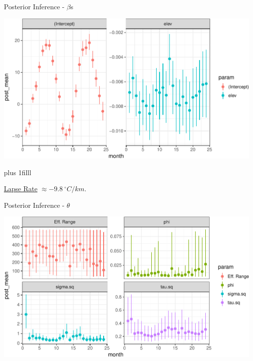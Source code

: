 \documentclass[11pt,ignorenonframetext,]{beamer}
\newcommand{\vvfill}{\vskip0pt plus 1filll}
\begin{document}
\begin{frame}{Posterior Inference - \(\beta\)s}
\protect\hypertarget{posterior-inference---betas}{}

\vspace{4mm}

\begin{center}\includegraphics[width=\textwidth]{Lec22_files/figure-beamer/unnamed-chunk-9-1} \end{center}

\vvfill

\href{https://en.wikipedia.org/wiki/Lapse_rate}{Lapse Rate}
\(\approx -9.8~^\circ C/km\).

\end{frame}

\begin{frame}{Posterior Inference - \(\theta\)}
\protect\hypertarget{posterior-inference---theta}{}

\vspace{4mm}

\begin{center}\includegraphics[width=\textwidth]{Lec22_files/figure-beamer/unnamed-chunk-10-1} \end{center}

\end{frame}
\end{document}
